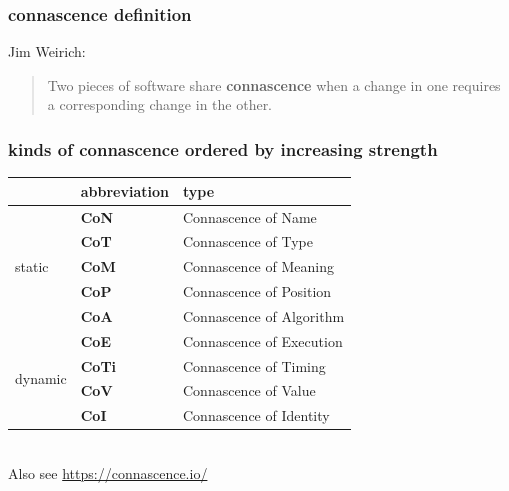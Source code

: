 \documentclass[aspectratio=169,12pt]{beamer}
\begin{document}
\begin{frame}
  \frametitle{connascence definition}
  Jim Weirich:\bigskip\\
  \begin{quote}
    Two pieces of software share \textbf{connascence} when a change in one requires a corresponding change in the other.
  \end{quote}
\end{frame}

\begin{frame}
  \frametitle{kinds of connascence ordered by increasing strength}
  \begin{center}
    \begin{tabular}{|l|l|l|}\hline
      & \textbf{abbreviation}  & \textbf{type} \\\hline
      \multirow{5}{*}{static}  & \textbf{CoN}  & Connascence of Name\\
      & \textbf{CoT}  & Connascence of Type\\
      & \textbf{CoM}  & Connascence of Meaning\\
      & \textbf{CoP}  & Connascence of Position\\
      & \textbf{CoA}  & Connascence of Algorithm\\\hline
      \multirow{4}{*}{dynamic} & \textbf{CoE}  & Connascence of Execution\\
      & \textbf{CoTi} & Connascence of Timing\\
      & \textbf{CoV}  & Connascence of Value\\
      & \textbf{CoI}  & Connascence of Identity\\\hline
    \end{tabular}\\\bigskip
    Also see \url{https://connascence.io/}
  \end{center}
\end{frame}
\end{document}
